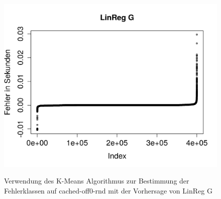 \documentclass[
	12pt,
	a4paper,
	BCOR10mm,
	DIV14,
	listof=totoc,
	bibliography=totoc,
	headsepline
]{scrreprt}
\begin{document}
\begin{figure}
{		\includegraphics[width=.43\textwidth]{Bilder/Plots/error_class/exploration/linreg_error_sorted_seq.png}
	} 	
	\\	
	\caption{Verwendung des K-Means Algorithmus zur Bestimmung der Fehlerklassen auf cached-off0-rnd mit der Vorhersage von \glqq LinReg G\grqq}
	\label{fig:error_class_clustering_seq}
\end{figure} 
\end{document}
